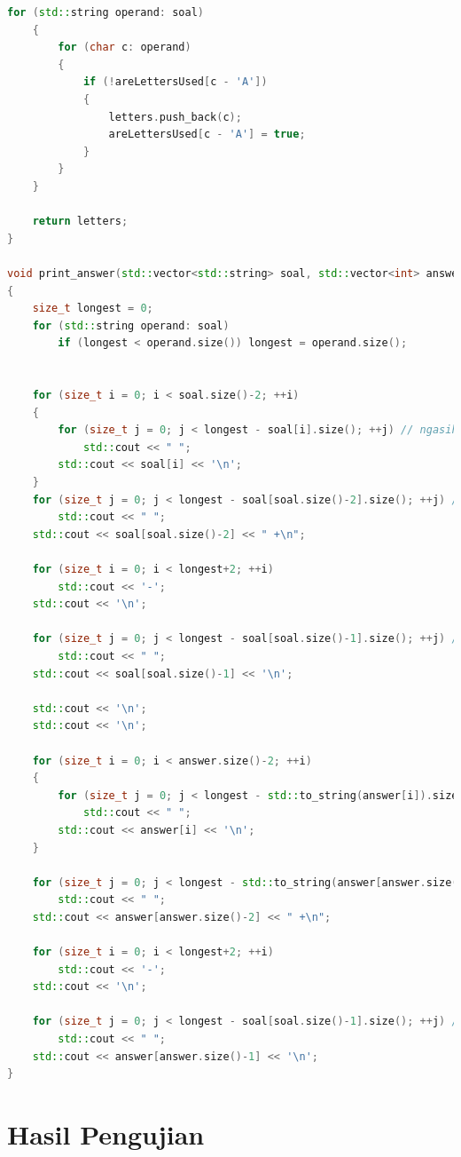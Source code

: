 \documentclass{article}
\begin{document}
\begin{lstlisting}[caption = "main.cpp", language = c++]
    for (std::string operand: soal)
    {
        for (char c: operand)
        {
            if (!areLettersUsed[c - 'A'])
            {
                letters.push_back(c);
                areLettersUsed[c - 'A'] = true;
            }
        }
    }

    return letters;
}

void print_answer(std::vector<std::string> soal, std::vector<int> answer)
{
    size_t longest = 0;
    for (std::string operand: soal)
        if (longest < operand.size()) longest = operand.size();


    for (size_t i = 0; i < soal.size()-2; ++i)
    {
        for (size_t j = 0; j < longest - soal[i].size(); ++j) // ngasih spasi
            std::cout << " ";
        std::cout << soal[i] << '\n';
    }
    for (size_t j = 0; j < longest - soal[soal.size()-2].size(); ++j) // ngasih spasi
        std::cout << " ";
    std::cout << soal[soal.size()-2] << " +\n";

    for (size_t i = 0; i < longest+2; ++i)
        std::cout << '-';
    std::cout << '\n';

    for (size_t j = 0; j < longest - soal[soal.size()-1].size(); ++j) // ngasih spasi
        std::cout << " ";
    std::cout << soal[soal.size()-1] << '\n';

    std::cout << '\n';
    std::cout << '\n';

    for (size_t i = 0; i < answer.size()-2; ++i)
    {
        for (size_t j = 0; j < longest - std::to_string(answer[i]).size(); ++j) // ngasih spasi
            std::cout << " ";
        std::cout << answer[i] << '\n';
    }

    for (size_t j = 0; j < longest - std::to_string(answer[answer.size()-2]).size(); ++j) // ngasih spasi
        std::cout << " ";
    std::cout << answer[answer.size()-2] << " +\n";

    for (size_t i = 0; i < longest+2; ++i)
        std::cout << '-';
    std::cout << '\n';

    for (size_t j = 0; j < longest - soal[soal.size()-1].size(); ++j) // ngasih spasi
        std::cout << " ";
    std::cout << answer[answer.size()-1] << '\n';
}
\end{lstlisting}

\section{Hasil Pengujian}
\end{document}
